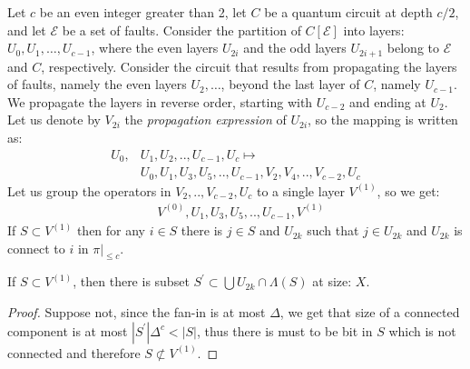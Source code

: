 \begin{claim}
  Let $c$ be an even integer greater than 2, let $C$ be a quantum circuit at depth $c/2$, and let $\mathcal{E}$ be a set of faults. Consider the partition of $C[\mathcal{E}]$ into layers: $U_{0}, U_{1}, \ldots, U_{c-1}$, where the even layers $U_{2i}$ and the odd layers $U_{2i+1}$ belong to $\mathcal{E}$ and $C$, respectively. Consider the circuit that results from propagating the layers of faults, namely the even layers $U_{2}, \ldots$, beyond the last layer of $C$, namely $U_{c-1}$. We propagate the layers in reverse order, starting with $U_{c-2}$ and ending at $U_{2}$. Let us denote by $V_{2i}$ the \textit{propagation expression} of $U_{2i}$, so the mapping is written as:
  \begin{equation*}
    \begin{split}
      U_{0},& U_{1},U_{2},..,U_{c-1},U_{c} \mapsto \\ 
      & U_{0},U_{1},U_{3},U_{5},..,U_{c-1},V_{2},V_{4},..,V_{c-2},U_{c}
    \end{split}
  \end{equation*}
  Let us group the operators in $V_{2},..,V_{c-2},U_{c}$ to a single layer $V^{(1)}$, so we get: 
  \begin{equation*}
    \begin{split}
      & V^{(0)},U_{1},U_{3},U_{5},..,U_{c-1},V^{(1)}
    \end{split}
  \end{equation*}
  If $S \subset V^{(1)}$ then for any $i \in S$ there is $j\in S$ and $U_{2k}$ such that $j \in U_{2k}$ and $U_{2k}$ is connect to $i$ in $\pi|_{\le c}$. 
\end{claim}

\begin{claim}
  If $S \subset V^{(1)}$, then there is subset $S^{\prime} \subset \bigcup U_{2k} \cap \Lambda(S)$ at size: $X$. 
\end{claim}
\begin{proof}
  Suppose not, since the fan-in is at most $\Delta$, we get that size of a connected component is at most $|S^{\prime}|\Delta^{c} < |S|$, thus there is must to be bit in $S$ which is not connected and therefore $S \not\subset V^{(1)}$. 
\end{proof}



